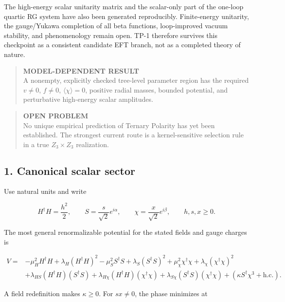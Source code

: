 \documentclass[
]{article}
\begin{document}
The high-energy scalar unitarity matrix and the scalar-only part of the
one-loop quartic RG system have also been generated reproducibly.
Finite-energy unitarity, the gauge/Yukawa completion of all beta
functions, loop-improved vacuum stability, and phenomenology remain
open. TP-1 therefore survives this checkpoint as a consistent candidate
EFT branch, not as a completed theory of nature.

\begin{quote}
\textbf{MODEL-DEPENDENT RESULT}\\
A nonempty, explicitly checked tree-level parameter region has the
required \(v\neq0\), \(f\neq0\), \(\langle\chi\rangle=0\), positive
radial masses, bounded potential, and perturbative high-energy scalar
amplitudes.
\end{quote}

\begin{quote}
\textbf{OPEN PROBLEM}\\
No unique empirical prediction of Ternary Polarity has yet been
established. The strongest current route is a kernel-sensitive selection
rule in a true \(Z_3\times Z_3\) realization.
\end{quote}

\hypertarget{canonical-scalar-sector}{%
\subsection{1. Canonical scalar sector}\label{canonical-scalar-sector}}

Use natural units and write

\[
H^\dagger H=\frac{h^2}{2},\qquad
S=\frac{s}{\sqrt2}e^{i\alpha},\qquad
\chi=\frac{x}{\sqrt2}e^{i\beta},
\qquad h,s,x\ge0.
\]

The most general renormalizable potential for the stated fields and
gauge charges is

\[
\begin{aligned}
V={}&-\mu_H^2H^\dagger H+\lambda_H(H^\dagger H)^2
-\mu_S^2S^\dagger S+\lambda_S(S^\dagger S)^2
+\mu_\chi^2\chi^\dagger\chi+\lambda_\chi(\chi^\dagger\chi)^2\\
&+\lambda_{HS}(H^\dagger H)(S^\dagger S)
+\lambda_{H\chi}(H^\dagger H)(\chi^\dagger\chi)
+\lambda_{S\chi}(S^\dagger S)(\chi^\dagger\chi)
+\left(\kappa S^\dagger\chi^3+\mathrm{h.c.}\right).
\end{aligned}
\]

A field redefinition makes \(\kappa\ge0\). For \(sx\neq0\), the phase
minimizes at
\end{document}
